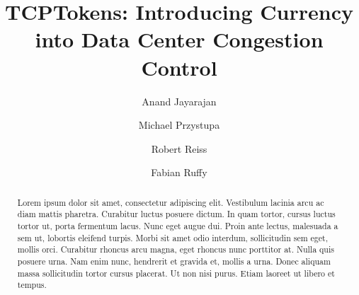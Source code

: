 \documentclass[sigconf]{acmart}
\begin{document}
\title{TCPTokens: Introducing Currency into Data Center Congestion Control}

\author{Anand Jayarajan}

\author{Michael Przystupa}

\author{Robert Reiss}

\author{Fabian Ruffy}



\begin{abstract}
Lorem ipsum dolor sit amet, consectetur adipiscing elit. Vestibulum lacinia arcu ac diam mattis pharetra. Curabitur luctus posuere dictum. In quam tortor, cursus luctus tortor ut, porta fermentum lacus. Nunc eget augue dui. Proin ante lectus, malesuada a sem ut, lobortis eleifend turpis. Morbi sit amet odio interdum, sollicitudin sem eget, mollis orci. Curabitur rhoncus arcu magna, eget rhoncus nunc porttitor at. Nulla quis posuere urna. Nam enim nunc, hendrerit et gravida et, mollis a urna. Donec aliquam massa sollicitudin tortor cursus placerat. Ut non nisi purus. Etiam laoreet ut libero et tempus. 
\end{abstract}



\maketitle





%






 
\end{document}
